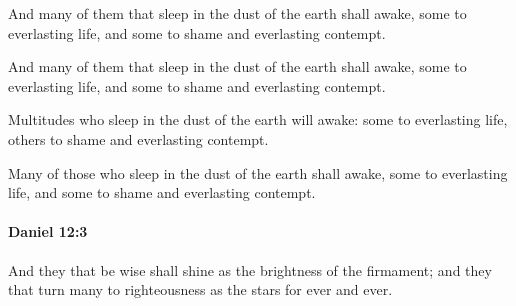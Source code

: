 			And many of them that sleep in the dust of the earth shall awake, some to everlasting life, and some to shame and everlasting contempt.

			\begin{versebox}
					\item[BHS] 
					\item[LXX] 
					\item[ASV] And many of them that sleep in the dust of the earth shall awake, some to everlasting life, and some to shame and everlasting contempt.
					\item[NIV] Multitudes who sleep in the dust of the earth will awake: some to everlasting life, others to shame and everlasting contempt.
					\item[NRSV] Many of those who sleep in the dust of the earth shall awake, some to everlasting life, and some to shame and everlasting contempt.
			\end{versebox}

		\paragraph{Daniel 12:3} %
			\label{DANIEL-12-3}

			And they that be wise shall shine as the brightness of the firmament; and they that turn many to righteousness as the stars for ever and ever.

